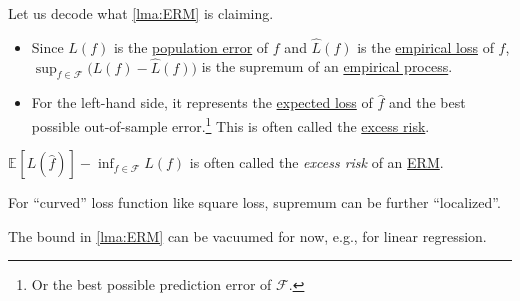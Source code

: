 \begin{note}
	Let us decode what \autoref{lma:ERM} is claiming.
	\begin{itemize}
		\item Since \(L(f)\) is the \hyperref[def:expected-loss]{population error} of \(f\) and \(\hat{L} (f)\) is the \hyperref[def:empirical-loss]{empirical loss} of \(f\), \(\sup _{f\in \mathscr{F} } \big( L(f) - \hat{L} (f) \big)\) is the supremum of an \hyperref[def:EP]{empirical process}.
		\item For the left-hand side, it represents the \hyperref[def:expected-loss]{expected loss} of \(\hat{f} \) and the best possible out-of-sample error.\footnote{Or the best possible prediction error of \(\mathscr{F} \).} This is often called the \hyperref[not:excess-risk]{excess risk}.
	\end{itemize}
\end{note}

\begin{notation}\label{not:excess-risk}
	\(\mathbb{E}_{}[L(\hat{f} ) ] - \inf _{f\in \mathscr{F} } L(f)\) is often called the \emph{excess risk} of an \hyperref[prb:ERM]{ERM}.
\end{notation}

\begin{remark}
	For ``curved'' loss function like square loss, supremum can be further ``localized''.
\end{remark}

\begin{remark}
	The bound in \autoref{lma:ERM} can be vacuumed for now, e.g., for linear regression.
\end{remark}

